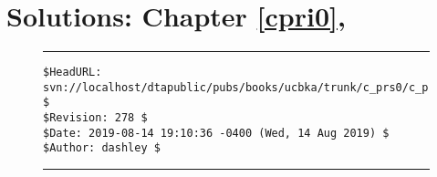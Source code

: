 
\chapter[Solutions: \cprizeroxrefcomma{}Chapter \ref{cpri0}]
        {Solutions: \cprizeroxrefcomma{}Chapter \ref{cpri0}, \cprizerolongtitle{}}

\label{cprs0}


\vfill
\noindent\begin{figure}[!b]
\noindent\rule[-0.25in]{\textwidth}{1pt}
\begin{tiny}
\begin{verbatim}
$HeadURL: svn://localhost/dtapublic/pubs/books/ucbka/trunk/c_prs0/c_prs0.tex $
$Revision: 278 $
$Date: 2019-08-14 19:10:36 -0400 (Wed, 14 Aug 2019) $
$Author: dashley $
\end{verbatim}
\end{tiny}
\noindent\rule[0.25in]{\textwidth}{1pt}
\end{figure}
%
